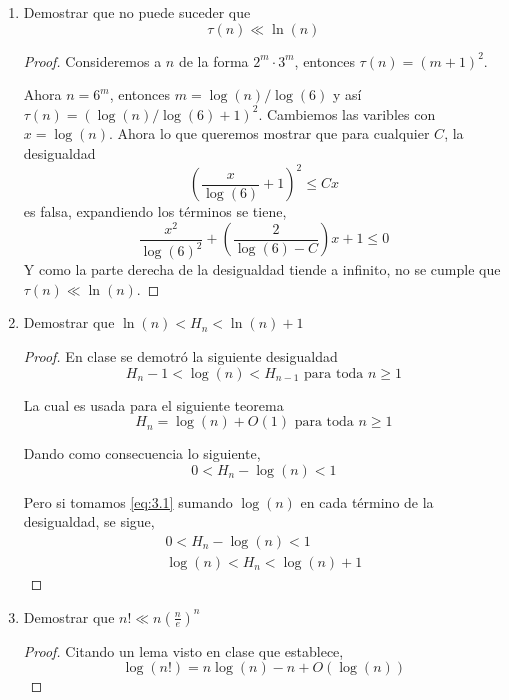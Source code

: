 \documentclass[letterpaper]{article}
\begin{document}
\begin{enumerate}
\item Demostrar que no puede suceder que
\[
    \tau(n) \ll \ln(n)
\]

\begin{proof}
Consideremos a $n$ de la forma $2^m \cdot 3^m$, entonces $\tau(n) = (m+1)^2$.

Ahora $n = 6^m$, entonces $m = \log(n)/\log(6)$ y así $\tau(n) = (\log(n)/\log(6) +1 )^2$. Cambiemos las varibles con
$x = \log(n)$. Ahora lo que queremos mostrar que para cualquier $C$, la desigualdad
\[
    \left(\frac{x}{\log(6)} + 1\right)^2 \leq Cx
\]
es falsa, expandiendo los términos se tiene,
\[
    \frac{x^2}{\log(6)^2} + \left( \frac{2}{\log(6) - C} \right) x + 1 \leq 0
\]
Y como la parte derecha de la desigualdad tiende a infinito, no se cumple que $\tau(n) \ll \ln(n)$.
\end{proof}

\item Demostrar que $\ln(n) < H_n < \ln(n) + 1$
\begin{proof}
En clase se demotró la siguiente desigualdad
\begin{equation}
    H_n - 1 < \log(n) < H_{n-1} \text{ para toda } n \geq 1
\end{equation}

La cual es usada para el siguiente teorema
\begin{equation}
    H_n = \log(n) + O(1) \text{ para toda } n \geq 1
\end{equation}

Dando como consecuencia lo siguiente,
\begin{equation}
    0 < H_n - \log(n) < 1
    \label{eq:3.1}
\end{equation}

Pero si tomamos \eqref{eq:3.1} sumando $\log(n)$ en cada término de la desigualdad, se sigue,
\begin{align*}
    0 < H_n - \log(n) < 1\\
    \log(n) < H_n < \log(n) + 1
\end{align*}

\end{proof}

\item Demostrar que $n! \ll n \left( \frac{n}{e} \right)^n$
\begin{proof}
Citando un lema visto en clase que establece,
\begin{equation}
    \log(n!) = n\log(n) - n + O(\log(n))
\end{equation}


\end{proof}
\end{enumerate}
\end{document}
